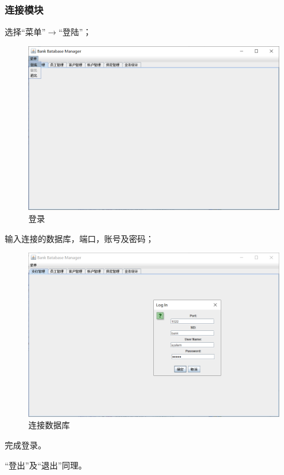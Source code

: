 \documentclass{ctexart}
\begin{document}
\subsubsection{\hei 连接模块}
选择“菜单”$\rightarrow$“登陆”；
\par 
\begin{figure}[H]
    \centering
    \includegraphics[scale=0.2]{deng.png}
    \caption{登录}
\end{figure}
输入连接的数据库，端口，账号及密码；
\par 
\begin{figure}[H]
    \centering
    \includegraphics[scale=0.2]{lu.png}
    \caption{连接数据库}
\end{figure}
完成登录。
\par “登出”及“退出”同理。
\end{document}
